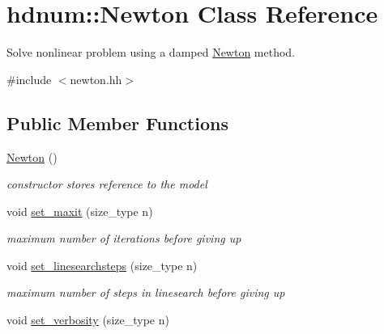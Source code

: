 \hypertarget{classhdnum_1_1Newton}{
\section{hdnum::Newton Class Reference}
\label{classhdnum_1_1Newton}
}


Solve nonlinear problem using a damped \hyperlink{classhdnum_1_1Newton}{Newton} method.  




{\ttfamily \#include $<$newton.hh$>$}

\subsection*{Public Member Functions}
\begin{DoxyCompactItemize}
\item 
\hypertarget{classhdnum_1_1Newton_aee062778e7fed23339a63ca5695e5a45}{
\hyperlink{classhdnum_1_1Newton_aee062778e7fed23339a63ca5695e5a45}{Newton} ()}
\label{classhdnum_1_1Newton_aee062778e7fed23339a63ca5695e5a45}

\begin{DoxyCompactList}\small\item\em constructor stores reference to the model \item\end{DoxyCompactList}\item 
\hypertarget{classhdnum_1_1Newton_a98bf335f10122b8199cd84c2d00b463e}{
void \hyperlink{classhdnum_1_1Newton_a98bf335f10122b8199cd84c2d00b463e}{set\_\-maxit} (size\_\-type n)}
\label{classhdnum_1_1Newton_a98bf335f10122b8199cd84c2d00b463e}

\begin{DoxyCompactList}\small\item\em maximum number of iterations before giving up \item\end{DoxyCompactList}\item 
\hypertarget{classhdnum_1_1Newton_a5f68ee3f5e2143b0c4f645ee9e42cdc3}{
void \hyperlink{classhdnum_1_1Newton_a5f68ee3f5e2143b0c4f645ee9e42cdc3}{set\_\-linesearchsteps} (size\_\-type n)}
\label{classhdnum_1_1Newton_a5f68ee3f5e2143b0c4f645ee9e42cdc3}

\begin{DoxyCompactList}\small\item\em maximum number of steps in linesearch before giving up \item\end{DoxyCompactList}\item 
\hypertarget{classhdnum_1_1Newton_a5d2e9decea2d4e71dc2d0a266c2e0010}{
void \hyperlink{classhdnum_1_1Newton_a5d2e9decea2d4e71dc2d0a266c2e0010}{set\_\-verbosity} (size\_\-type n)}
\label{classhdnum_1_1Newton_a5d2e9decea2d4e71dc2d0a266c2e0010}


\end{DoxyCompactItemize}

